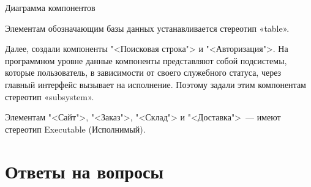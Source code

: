 \begin{image}
	\caption{Диаграмма компонентов}
	\label{fig:components}
\end{image}

Элементам обозначающим базы данных устанавливается стереотип «table».\par
Далее, создали компоненты "<Поисковая строка"> и "<Авторизация">.
На программном уровне данные компоненты представляют собой
подсистемы, которые пользователь, в зависимости от своего служебного статуса,
через главный интерфейс вызывает на исполнение. Поэтому задали
этим компонентам стереотип «subsystem».\par
Элементам "<Сайт">, "<Заказ">, "<Склад"> и "<Доставка">~--- 
имеют стереотип Executable (Исполнимый).

\clearpage

\section*{Ответы на вопросы}

